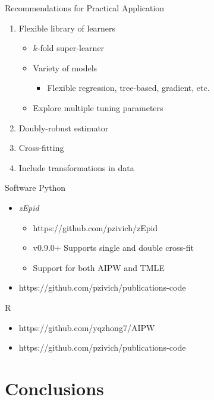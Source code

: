 \documentclass{beamer}
\begin{document}
\begin{frame}{Recommendations for Practical Application}
	\begin{enumerate}
		\item Flexible library of learners
		\begin{itemize}
			\item $k$-fold super-learner
			\item Variety of models
			\begin{itemize}
				\item Flexible regression, tree-based, gradient, etc.
			\end{itemize}
			\item Explore multiple tuning parameters
		\end{itemize}
		\item Doubly-robust estimator
		\item Cross-fitting
		\item Include transformations in data
	\end{enumerate}
\end{frame}

\begin{frame}{Software}
	Python
	\begin{itemize}
		\item \textit{zEpid}
		\begin{itemize}
			\item https://github.com/pzivich/zEpid
			\item v0.9.0+ Supports single and double cross-fit
			\item Support for both AIPW and TMLE
		\end{itemize}
		\item https://github.com/pzivich/publications-code
	\end{itemize}
	R
	\begin{itemize}
		\item https://github.com/yqzhong7/AIPW
		\item https://github.com/pzivich/publications-code
	\end{itemize}
\end{frame}

\section{Conclusions}
\end{document}

